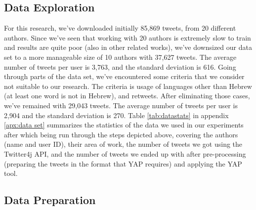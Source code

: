 \documentclass[a4paper]{article}
\begin{document}
\subsection{Data Exploration}

For this research, we've downloaded initially 85,869 tweets, from 20 different authors. Since we've seen that working with 20 authors is extremely slow to train and results are quite poor (also in other related works), we've downsized our data set to a more manageable size of 10 authors with 37,627 tweets.
The average number of tweets per user is 3,763, and the standard deviation is 616.
Going through parts of the data set, we've encountered some criteria that we consider not suitable to our research. The criteria is usage of languages other than Hebrew (at least one word is not in Hebrew), and retweets.
After eliminating those cases, we've remained with 29,043 tweets. The average number of tweets per user is 2,904 and the standard deviation is 270.
Table \ref{tab:datastats} in appendix \ref{apx:data set} summarizes the statistics of the data we used in our experiments after which being run through the steps depicted above, covering the authors (name and user ID), their area of work, the number of tweets we got using the Twitter4j API, and the number of tweets we ended up with after pre-processing (preparing the tweets in the format that YAP requires) and applying the YAP tool.\\

\subsection{Data Preparation}
\end{document}
